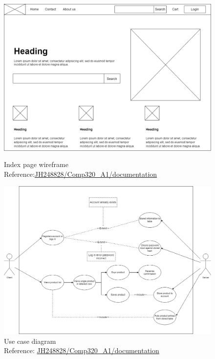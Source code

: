 \documentclass[article]{IEEEtran}
\begin{document}
        \begin{figure}
            \caption{Index page wireframe \\\hspace{\textwidth} Reference:\href{https://github.falmouth.ac.uk/JH248828/Comp320_A1-Comp360_A1/tree/documentation}{JH248828/Comp320\_A1/documentation} \\\hspace{\textwidth}}
            \includegraphics[width=\columnwidth]{images/artefact/index-wireframe.png}
            \label{fig:index-wireframe}
        \end{figure}

        \begin{figure}[]
            \caption{Use case diagram \\\hspace{\textwidth} Reference: \href{https://github.falmouth.ac.uk/JH248828/Comp320_A1-Comp360_A1/tree/documentation}{JH248828/Comp320\_A1/documentation}}
            \includegraphics[width=\columnwidth]{images/artefact/use-case-diagram.png}
        \end{figure}
\end{document}
